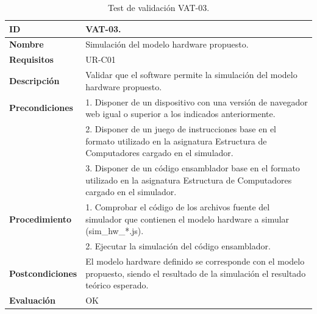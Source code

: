 \begin{center}
\begin{table}[htb]
\centering
\caption{Test de validación VAT-03.}
\begin{tabular}{@{}p{2.5cm} p{9cm}@{}} 
\toprule
\textbf{ID} 					& VAT-03. \\
\midrule
\textbf{Nombre} 				& Simulación del modelo hardware propuesto. \\
\midrule
\textbf{Requisitos} 		& UR-C01 \\
\midrule
\textbf{Descripción} 		& Validar que el software permite la simulación del modelo hardware propuesto. \\
\midrule
\textbf{Precondiciones}		& 1. Disponer de un dispositivo con una versión de navegador web igual o superior a los indicados anteriormente. \\
											& 2. Disponer de un juego de instrucciones base en el formato utilizado en la asignatura Estructura de Computadores cargado en el simulador. \\
											& 3. Disponer de un código ensamblador base en el formato utilizado en la asignatura Estructura de Computadores cargado en el simulador. \\
\midrule
\textbf{Procedimiento}		& 1. Comprobar el código de los archivos fuente del simulador que contienen el modelo hardware a simular (sim\_hw\_*.js).\\
											& 2. Ejecutar la simulación del código ensamblador.\\
\midrule
\textbf{Postcondiciones} 		&  El modelo hardware definido se corresponde con el modelo propuesto, siendo el resultado de la simulación el resultado teórico esperado.\\
\midrule
\textbf{Evaluación} 			& OK \\
\bottomrule
\end{tabular}
\label{tab:vat-03}
\end{table}
\end{center}

